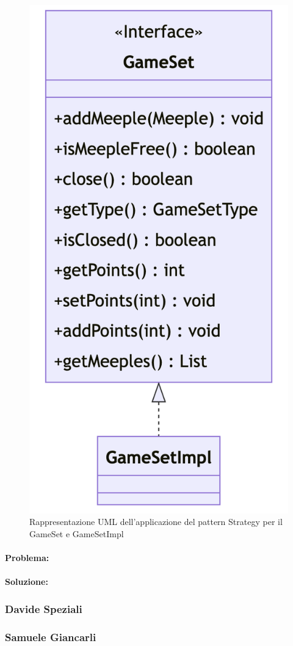 \begin{figure}[hh]
    \centering\includegraphics[scale=.4]{images/gameset.png}
    \caption{Rappresentazione UML dell'applicazione del pattern Strategy per il GameSet e GameSetImpl}
\end{figure}
\paragraph{Problema:}

\paragraph{Soluzione:} 

\subsubsection*{Davide Speziali}

\subsubsection*{Samuele Giancarli}
